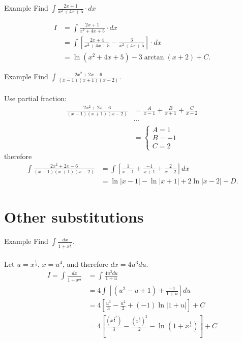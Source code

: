 \documentclass{report}
\begin{document}
		\begin{question}{Example}
			Find $\int \frac{2x + 1}{x^2 + 4x + 5} \cdot dx$

			\begin{align*}
				I &= \int \frac{2x + 1}{x^2 + 4x + 5} \cdot dx	\\
				  &= \int \left[\frac{2x + 4}{x^2 + 4x + 5} - \frac{3}{x^2 + 4x + 5}\right] \cdot dx	\\
				  &= \ln(x^2 + 4x + 5) - 3 \arctan(x + 2) + C.
			\end{align*}
		\end{question}

		\begin{question}{Example}
			Find $\int \frac{2x^2 + 2x - 6}{(x - 1)(x + 1)(x - 2)}$.
			\\ \\
			Use partial fraction:
			\begin{align*}
				\frac{2x^2 + 2x - 6}{(x - 1)(x + 1)(x - 2)} &= \frac{A}{x - 1} + \frac{B}{x + 1} + \frac{C}{x - 2}	\\
															& \cdots	\\
															&= \begin{cases} A = 1 \\ B = -1 \\ C = 2 \end{cases}
			\end{align*}
			therefore
			\begin{align*}
				\int \frac{2x^2 + 2x - 6}{(x - 1)(x + 1)(x - 2)} &= \int \left[\frac{1}{x - 1} + \frac{-1}{x + 1} + \frac{2}{x - 2}\right] dx	\\
																 &= \ln|x - 1| - \ln|x+1| + 2 \ln |x - 2| + D.
			\end{align*}
		\end{question}

	\section{Other substitutions}

		\begin{question}{Example}
			Find $\int \frac{dx}{1 + x^{\frac{1}{4}}}$.
			\\ \\
			Let $u = x^{\frac{1}{4}}$, $x = u^4$, and therefore $dx = 4 u^3 du$.
			\begin{align*}
				I = \int \frac{dx}{1 + x^{\frac{1}{4}}} &= \int \frac{4u^3 du}{1 + u}	\\
														&= 4 \int \left[(u^2 - u + 1) + \frac{-1}{1 + u}\right]du	\\
														&= 4 \left[ \frac{u^3}{3} - \frac{u^2}{2} + (-1)\ln|1 + u|\right] + C	\\
														&= 4 \left[\frac{(x^{\frac{1}{4}}^3)}{3} - \frac{(x^{\frac{1}{4}})^2}{2} - \ln(1 + x^\frac{1}{4})\right] + C
			\end{align*}
		\end{question}
\end{document}
